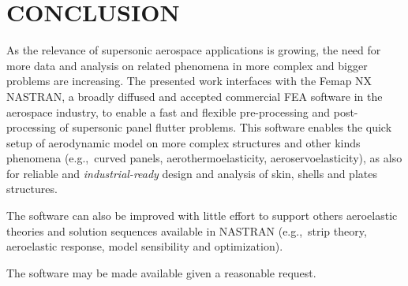 
\section{CONCLUSION}

As the relevance of supersonic aerospace applications is growing, the need for more data and analysis on
related phenomena in more complex and bigger problems are increasing. The presented work interfaces with the Femap NX NASTRAN,
a broadly diffused and accepted commercial FEA software in the aerospace industry, to enable a fast and flexible pre-processing and post-processing of supersonic panel flutter problems.
This software enables the quick setup of aerodynamic model on more complex structures and other kinds phenomena (e.g.,\ curved panels, aerothermoelasticity, aeroservoelasticity),
as also for reliable and \emph{industrial-ready} design and analysis
of skin, shells and plates structures.

The software can also be improved with little effort to support others aeroelastic theories and solution sequences available in NASTRAN (e.g.,\ strip theory, aeroelastic response, model sensibility and optimization).

The software may be made available given a reasonable request.
